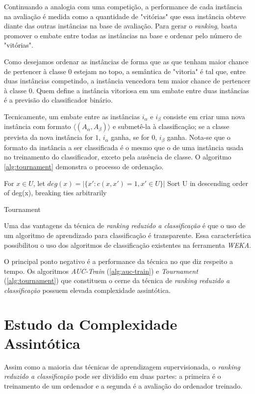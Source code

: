 Continuando a analogia com uma competição, a performance de cada instância na avaliação é medida como a quantidade de "vitórias" que essa instância obteve diante das outras instâncias na base de avaliação. Para gerar o \emph{ranking}, basta promover o embate entre todas as instâncias na base e ordenar pelo número de "vitórias".

Como desejamos ordenar as instâncias de forma que as que tenham maior chance de pertencer à classe $0$ estejam no topo, a semântica de "vitoria" é tal que, entre duas instâncias competindo, a instância vencedora tem maior chance de pertencer à classe $0$. Quem define a instância vitoriosa em um embate entre duas instâncias é a previsão do classificador binário.

Tecnicamente, um embate entre as instâncias $i_\alpha$ e $i_\beta$ consiste em criar uma nova instância com formato $\langle (A_\alpha, A_\beta)\rangle$ e submetê-la à classificação; se a classe prevista da nova instância for $1$, $i_\alpha$ ganha, se for $0$, $i_\beta$ ganha. Nota-se que o formato da instância a ser classificada é o mesmo que o de uma instância usada no treinamento do classificador, exceto pela ausência de classe. O algoritmo \ref{alg:tournament} demonstra o processo de ordenação.

\begin{algorithm}
    For $x \in U$, let $deg(x) = |\{x':c(x, x') = 1, x' \in U\}|$
    Sort U in descending order of deg(x), breaking ties arbitrarily
    
    \caption{Tournament}
    \label{alg:tournament}
\end{algorithm}

Uma das vantagens da técnica de \emph{ranking reduzido a classificação} é que o uso de um algoritmo de aprendizado para classificação é transparente. Essa característica possibilitou o uso dos algoritmos de classificação existentes na ferramenta \emph{WEKA}.

O principal ponto negativo é a performance da técnica no que diz respeito a tempo. Os algoritmos \emph{AUC-Train} (\ref{alg:auc-train}) e \emph{Tournament} (\ref{alg:tournament}) que constituem o cerne da técnica de \emph{ranking reduzido a classificação} possuem elevada complexidade assintótica.


\section{Estudo da Complexidade Assintótica}

Assim como a maioria das técnicas de aprendizagem supervisionada, o \emph{ranking reduzido a classificação} pode ser dividido em duas partes: a primeira é o treinamento de um ordenador e a segunda é a avaliação do ordenador treinado.

